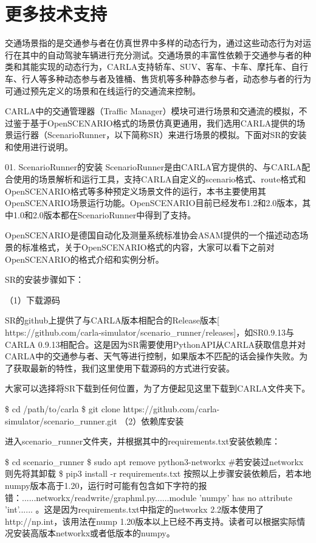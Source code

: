 \section{更多技术支持}
交通场景指的是交通参与者在仿真世界中多样的动态行为，通过这些动态行为对运行在其中的自动驾驶车辆进行充分测试。交通场景的丰富性依赖于交通参与者的种类和其能实现的动态行为，CARLA支持轿车、SUV、客车、卡车、摩托车、自行车、行人等多种动态参与者及锥桶、售货机等多种静态参与者，动态参与者的行为可通过预先定义的场景和在线运行的交通流来控制。

CARLA中的交通管理器（Traffic Manager）模块可进行场景和交通流的模拟，不过鉴于基于OpenSCENARIO格式的场景仿真更通用，我们选用CARLA提供的场景运行器（ScenarioRunner，以下简称SR）来进行场景的模拟。下面对SR的安装和使用进行说明。

01. ScenarioRunner的安装
ScenarioRunner是由CARLA官方提供的、与CARLA配合使用的场景解析和运行工具，支持CARLA自定义的scenario格式、route格式和OpenSCENARIO格式等多种预定义场景文件的运行，本书主要使用其OpenSCENARIO场景运行功能。OpenSCENARIO目前已经发布1.2和2.0版本，其中1.0和2.0版本都在ScenarioRunner中得到了支持。

OpenSCENARIO是德国自动化及测量系统标准协会ASAM提供的一个描述动态场景的标准格式，关于OpenSCENARIO格式的内容，大家可以看下之前对OpenSCENARIO的格式介绍和实例分析。

SR的安装步骤如下：

（1）下载源码

SR的github上提供了与CARLA版本相配合的Release版本[ https://github.com/carla-simulator/scenario\_runner/releases]，如SR0.9.13与CARLA 0.9.13相配合。这是因为SR需要使用PythonAPI从CARLA获取信息并对CARLA中的交通参与者、天气等进行控制，如果版本不匹配的话会操作失败。为了获取最新的特性，我们这里使用下载源码的方式进行安装。

大家可以选择将SR下载到任何位置，为了方便起见这里下载到CARLA文件夹下。

\$ cd /path/to/carla
\$ git clone https://github.com/carla-simulator/scenario\_runner.git
（2）依赖库安装

进入scenario\_runner文件夹，并根据其中的requirements.txt安装依赖库：

\$ cd scenario\_runner
\$ sudo apt remove python3-networkx \#若安装过networkx则先将其卸载
\$ pip3 install -r requirements.txt
按照以上步骤安装依赖后，若本地numpy版本高于1.20，运行时可能有包含如下字符的报错：......networkx/readwrite/graphml.py......module 'numpy' has no attribute 'int'...... 。这是因为requirements.txt中指定的networkx 2.2版本使用了http://np.int，该用法在nump 1.20版本以上已经不再支持。读者可以根据实际情况安装高版本networkx或者低版本的numpy。

